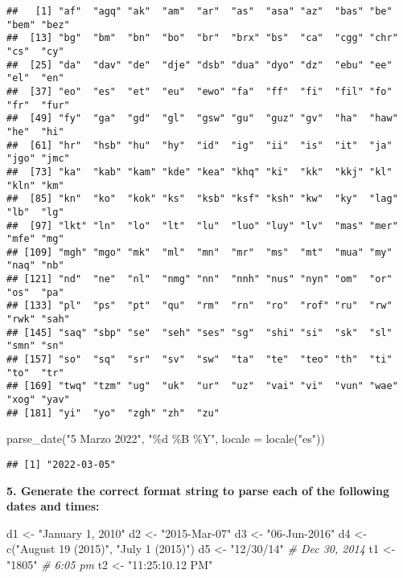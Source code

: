 \documentclass[
]{article}
\newenvironment{Shaded}{\begin{snugshade}}{\end{snugshade}}
\newcommand{\AttributeTok}[1]{\textcolor[rgb]{0.77,0.63,0.00}{#1}}
\newcommand{\CommentTok}[1]{\textcolor[rgb]{0.56,0.35,0.01}{\textit{#1}}}
\newcommand{\FunctionTok}[1]{\textcolor[rgb]{0.00,0.00,0.00}{#1}}
\newcommand{\NormalTok}[1]{#1}
\newcommand{\OtherTok}[1]{\textcolor[rgb]{0.56,0.35,0.01}{#1}}
\newcommand{\StringTok}[1]{\textcolor[rgb]{0.31,0.60,0.02}{#1}}
\begin{document}
\begin{verbatim}
##   [1] "af"  "agq" "ak"  "am"  "ar"  "as"  "asa" "az"  "bas" "be"  "bem" "bez"
##  [13] "bg"  "bm"  "bn"  "bo"  "br"  "brx" "bs"  "ca"  "cgg" "chr" "cs"  "cy" 
##  [25] "da"  "dav" "de"  "dje" "dsb" "dua" "dyo" "dz"  "ebu" "ee"  "el"  "en" 
##  [37] "eo"  "es"  "et"  "eu"  "ewo" "fa"  "ff"  "fi"  "fil" "fo"  "fr"  "fur"
##  [49] "fy"  "ga"  "gd"  "gl"  "gsw" "gu"  "guz" "gv"  "ha"  "haw" "he"  "hi" 
##  [61] "hr"  "hsb" "hu"  "hy"  "id"  "ig"  "ii"  "is"  "it"  "ja"  "jgo" "jmc"
##  [73] "ka"  "kab" "kam" "kde" "kea" "khq" "ki"  "kk"  "kkj" "kl"  "kln" "km" 
##  [85] "kn"  "ko"  "kok" "ks"  "ksb" "ksf" "ksh" "kw"  "ky"  "lag" "lb"  "lg" 
##  [97] "lkt" "ln"  "lo"  "lt"  "lu"  "luo" "luy" "lv"  "mas" "mer" "mfe" "mg" 
## [109] "mgh" "mgo" "mk"  "ml"  "mn"  "mr"  "ms"  "mt"  "mua" "my"  "naq" "nb" 
## [121] "nd"  "ne"  "nl"  "nmg" "nn"  "nnh" "nus" "nyn" "om"  "or"  "os"  "pa" 
## [133] "pl"  "ps"  "pt"  "qu"  "rm"  "rn"  "ro"  "rof" "ru"  "rw"  "rwk" "sah"
## [145] "saq" "sbp" "se"  "seh" "ses" "sg"  "shi" "si"  "sk"  "sl"  "smn" "sn" 
## [157] "so"  "sq"  "sr"  "sv"  "sw"  "ta"  "te"  "teo" "th"  "ti"  "to"  "tr" 
## [169] "twq" "tzm" "ug"  "uk"  "ur"  "uz"  "vai" "vi"  "vun" "wae" "xog" "yav"
## [181] "yi"  "yo"  "zgh" "zh"  "zu"
\end{verbatim}

\begin{Shaded}
\begin{Highlighting}[]
\FunctionTok{parse\_date}\NormalTok{(}\StringTok{"5 Marzo 2022"}\NormalTok{, }\StringTok{"\%d \%B \%Y"}\NormalTok{, }\AttributeTok{locale =} \FunctionTok{locale}\NormalTok{(}\StringTok{"es"}\NormalTok{))}
\end{Highlighting}
\end{Shaded}

\begin{verbatim}
## [1] "2022-03-05"
\end{verbatim}

\textbf{5. Generate the correct format string to parse each of the
following dates and times:}

\begin{Shaded}
\begin{Highlighting}[]
\NormalTok{d1 }\OtherTok{\textless{}{-}} \StringTok{"January 1, 2010"}
\NormalTok{d2 }\OtherTok{\textless{}{-}} \StringTok{"2015{-}Mar{-}07"}
\NormalTok{d3 }\OtherTok{\textless{}{-}} \StringTok{"06{-}Jun{-}2016"}
\NormalTok{d4 }\OtherTok{\textless{}{-}} \FunctionTok{c}\NormalTok{(}\StringTok{"August 19 (2015)"}\NormalTok{, }\StringTok{"July 1 (2015)"}\NormalTok{)}
\NormalTok{d5 }\OtherTok{\textless{}{-}} \StringTok{"12/30/14"} \CommentTok{\# Dec 30, 2014}
\NormalTok{t1 }\OtherTok{\textless{}{-}} \StringTok{"1805"} \CommentTok{\# 6:05 pm}
\NormalTok{t2 }\OtherTok{\textless{}{-}} \StringTok{"11:25:10.12 PM"}
\end{Highlighting}
\end{Shaded}
\end{document}
